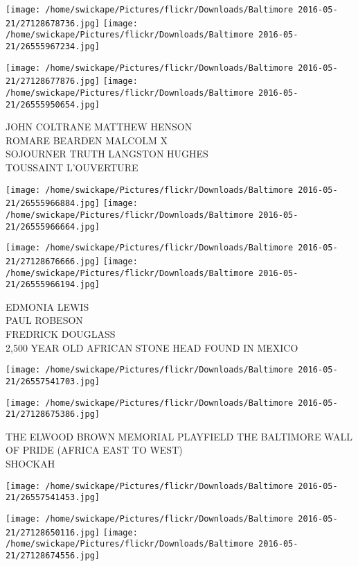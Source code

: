 \documentclass[10pt,letterpaper]{article}
\begin{document}
\texttt{[image: /home/swickape/Pictures/flickr/Downloads/Baltimore 2016-05-21/27128678736.jpg]}
\texttt{[image: /home/swickape/Pictures/flickr/Downloads/Baltimore 2016-05-21/26555967234.jpg]}

\texttt{[image: /home/swickape/Pictures/flickr/Downloads/Baltimore 2016-05-21/27128677876.jpg]}
\texttt{[image: /home/swickape/Pictures/flickr/Downloads/Baltimore 2016-05-21/26555950654.jpg]}

JOHN COLTRANE MATTHEW HENSON\\
ROMARE BEARDEN MALCOLM X\\
SOJOURNER TRUTH LANGSTON HUGHES\\
TOUSSAINT L'OUVERTURE\\
\pagebreak

\texttt{[image: /home/swickape/Pictures/flickr/Downloads/Baltimore 2016-05-21/26555966884.jpg]}
\texttt{[image: /home/swickape/Pictures/flickr/Downloads/Baltimore 2016-05-21/26555966664.jpg]}

\texttt{[image: /home/swickape/Pictures/flickr/Downloads/Baltimore 2016-05-21/27128676666.jpg]}
\texttt{[image: /home/swickape/Pictures/flickr/Downloads/Baltimore 2016-05-21/26555966194.jpg]}

EDMONIA LEWIS\\
PAUL ROBESON\\
FREDRICK DOUGLASS\\
2,500 YEAR OLD AFRICAN STONE HEAD FOUND IN MEXICO\\
\pagebreak

\texttt{[image: /home/swickape/Pictures/flickr/Downloads/Baltimore 2016-05-21/26557541703.jpg]}

\vspace{0.25in}
\texttt{[image: /home/swickape/Pictures/flickr/Downloads/Baltimore 2016-05-21/27128675386.jpg]}

THE ELWOOD BROWN MEMORIAL PLAYFIELD THE BALTIMORE WALL OF PRIDE (AFRICA EAST TO WEST)\\
SHOCKAH\\
\pagebreak

\texttt{[image: /home/swickape/Pictures/flickr/Downloads/Baltimore 2016-05-21/26557541453.jpg]}

\vspace{0.25in}
\texttt{[image: /home/swickape/Pictures/flickr/Downloads/Baltimore 2016-05-21/27128650116.jpg]}
\texttt{[image: /home/swickape/Pictures/flickr/Downloads/Baltimore 2016-05-21/27128674556.jpg]}
\end{document}
